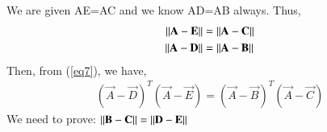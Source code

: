 \documentclass[journal,12pt,twocolumn]{IEEEtran}
\begin{document}
We are given AE=AC and we know AD=AB always. Thus, 
\begin{align}
    \left\lVert\mathbf{A}-\mathbf{E}\right\rVert  &=  \left\lVert\mathbf{A}-\mathbf{C}\right\rVert\label{eq8}\\
    \left\lVert\mathbf{A}-\mathbf{D}\right\rVert  &=  \left\lVert\mathbf{A}-\mathbf{B}\right\rVert\label{eq9}
\end{align}
Then, from (\ref{eq7}), we have,
\begin{align}
(\vec A -\vec D)^T(\vec{A}-\vec{E}) =  (\vec A -\vec B)^T(\vec{A}-\vec{C})\label{eq10}
\end{align}
We need to prove: $\left\lVert\mathbf{B} - \mathbf{C}\right\rVert = \left\lVert\mathbf{D} - \mathbf{E}\right\rVert$ 
\end{document}
